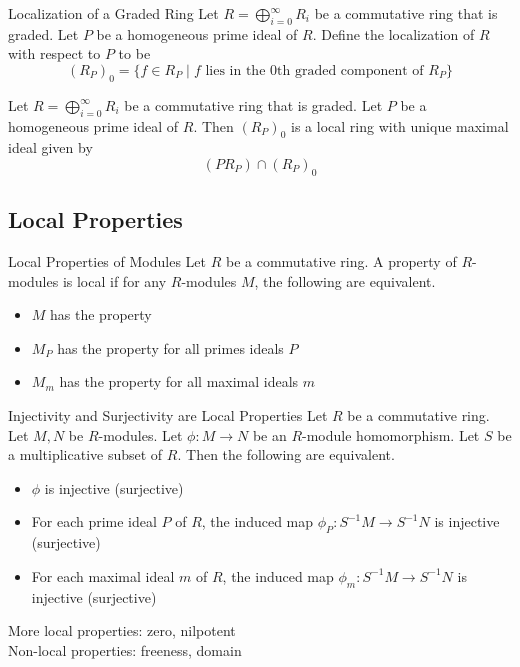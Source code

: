 \documentclass[a4paper]{article}
\begin{document}
\begin{defn}{Localization of a Graded Ring}{} Let $R=\bigoplus_{i=0}^\infty R_i$ be a commutative ring that is graded. Let $P$ be a homogeneous prime ideal of $R$. Define the localization of $R$ with respect to $P$ to be $$(R_P)_0=\{f\in R_P\;|\;f\text{ lies in the }0\text{th graded component of }R_P\}$$
\end{defn}

\begin{prp}{}{} Let $R=\bigoplus_{i=0}^\infty R_i$ be a commutative ring that is graded. Let $P$ be a homogeneous prime ideal of $R$. Then $(R_P)_0$ is a local ring with unique maximal ideal given by $$(PR_P)\cap(R_P)_0$$
\end{prp}

\subsection{Local Properties}
\begin{defn}{Local Properties of Modules}{} Let $R$ be a commutative ring. A property of $R$-modules is local if for any $R$-modules $M$, the following are equivalent. 
\begin{itemize}
\item $M$ has the property
\item $M_P$ has the property for all primes ideals $P$
\item $M_m$ has the property for all maximal ideals $m$
\end{itemize}
\end{defn}

\begin{prp}{Injectivity and Surjectivity are Local Properties}{} Let $R$ be a commutative ring. Let $M,N$ be $R$-modules. Let $\phi:M\to N$ be an $R$-module homomorphism. Let $S$ be a multiplicative subset of $R$. Then the following are equivalent. 
\begin{itemize}
\item $\phi$ is injective (surjective)
\item For each prime ideal $P$ of $R$, the induced map $\phi_P:S^{-1}M\to S^{-1}N$ is injective (surjective)
\item For each maximal ideal $m$ of $R$, the induced map $\phi_m:S^{-1}M\to S^{-1}N$ is injective (surjective)
\end{itemize}
\end{prp}

More local properties: zero, nilpotent\\
Non-local properties: freeness, domain
\end{document}
